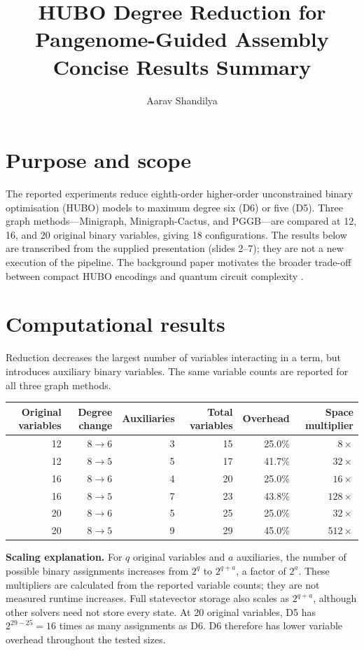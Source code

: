 \documentclass[10pt,letterpaper]{article}
\title{\vspace{-1.8em}HUBO Degree Reduction for Pangenome-Guided Assembly\\
\large Concise Results Summary}
\author{Aarav Shandilya}
\date{}
\begin{document}
\maketitle
\vspace{-1.5em}
\section*{Purpose and scope}
The reported experiments reduce eighth-order higher-order unconstrained binary
optimisation (HUBO) models to maximum degree six (D6) or five (D5).
Three graph methods---Minigraph, Minigraph-Cactus, and PGGB---are compared at
12, 16, and 20 original binary variables, giving 18 configurations.
The results below are transcribed from the supplied presentation
(slides 2--7); they are not a new execution of the pipeline.
The background paper motivates the broader trade-off between compact HUBO
encodings and quantum circuit complexity \cite{cudby}.

\section*{Computational results}
Reduction decreases the largest number of variables interacting in a term,
but introduces auxiliary binary variables. The same variable counts are
reported for all three graph methods.
\begin{center}
\small
\begin{tabular}{rrrrrr}
\toprule
Original variables & Degree change & Auxiliaries & Total variables & Overhead & Space multiplier\\
\midrule
12 & $8\to6$ & 3 & 15 & 25.0\% & $8\times$\\
12 & $8\to5$ & 5 & 17 & 41.7\% & $32\times$\\
16 & $8\to6$ & 4 & 20 & 25.0\% & $16\times$\\
16 & $8\to5$ & 7 & 23 & 43.8\% & $128\times$\\
20 & $8\to6$ & 5 & 25 & 25.0\% & $32\times$\\
20 & $8\to5$ & 9 & 29 & 45.0\% & $512\times$\\
\bottomrule
\end{tabular}
\end{center}
\textbf{Scaling explanation.}
For $q$ original variables and $a$ auxiliaries, the number of possible binary
assignments increases from $2^q$ to $2^{q+a}$, a factor of $2^a$.
These multipliers are calculated from the reported variable counts;
they are not measured runtime increases. Full statevector storage also
scales as $2^{q+a}$, although other solvers need not store every state.
At 20 original variables, D5 has $2^{29-25}=16$ times as many assignments
as D6. D6 therefore has lower variable overhead throughout the tested sizes.
\end{document}
